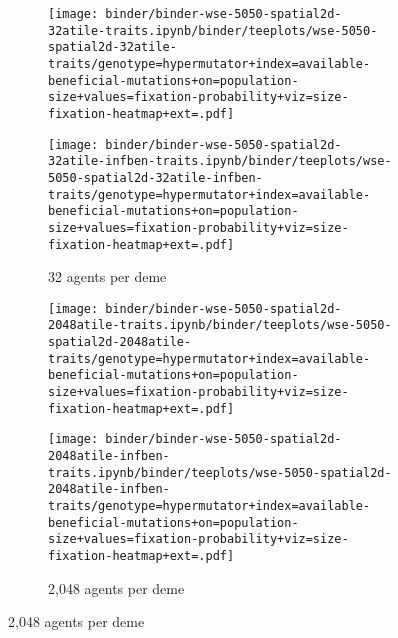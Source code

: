 \begin{figure}[h]
    \begin{subfigure}[b]{\linewidth}
        \begin{minipage}{0.5\linewidth}
          \texttt{[image: binder/binder-wse-5050-spatial2d-32atile-traits.ipynb/binder/teeplots/wse-5050-spatial2d-32atile-traits/genotype=hypermutator+index=available-beneficial-mutations+on=population-size+values=fixation-probability+viz=size-fixation-heatmap+ext=.pdf]}%
        \end{minipage}
        \begin{minipage}{0.5\linewidth}
          \texttt{[image: binder/binder-wse-5050-spatial2d-32atile-infben-traits.ipynb/binder/teeplots/wse-5050-spatial2d-32atile-infben-traits/genotype=hypermutator+index=available-beneficial-mutations+on=population-size+values=fixation-probability+viz=size-fixation-heatmap+ext=.pdf]}%
        \end{minipage}

        \caption{32 agents per deme}
        \label{fig:fixheat-altatile:32}

    \end{subfigure}

\begin{subfigure}[b]{\linewidth}
    \begin{minipage}{0.5\linewidth}
          \texttt{[image: binder/binder-wse-5050-spatial2d-2048atile-traits.ipynb/binder/teeplots/wse-5050-spatial2d-2048atile-traits/genotype=hypermutator+index=available-beneficial-mutations+on=population-size+values=fixation-probability+viz=size-fixation-heatmap+ext=.pdf]}%
    \end{minipage}%
    \begin{minipage}{0.5\linewidth}
          \texttt{[image: binder/binder-wse-5050-spatial2d-2048atile-infben-traits.ipynb/binder/teeplots/wse-5050-spatial2d-2048atile-infben-traits/genotype=hypermutator+index=available-beneficial-mutations+on=population-size+values=fixation-probability+viz=size-fixation-heatmap+ext=.pdf]}%
    \end{minipage}

\caption{2,048 agents per deme}
\label{fig:fixheat-altatile:2048}
\end{subfigure}


\end{figure}
